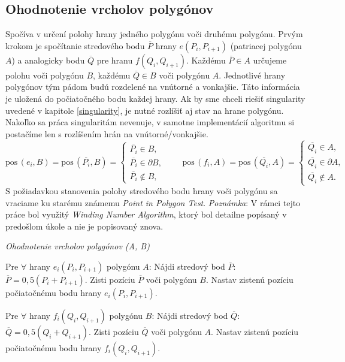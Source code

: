 \documentclass[11pt]{article}
\begin{document}
\subsection{Ohodnotenie vrcholov polygónov} \label{position}
Spočíva v určení polohy hrany jedného polygónu voči druhému polygónu. Prvým krokom je spočítanie stredového bodu $\overline{P}$ hrany $e(P_i, P_{i+1})$ (patriacej polygónu $A$) a analogicky bodu $\overline{Q}$ pre \linebreak hranu $f(Q_i, Q_{i+1})$. Každému $\overline{P} \in A$ určujeme polohu voči polygónu $B$, každému $\overline{Q} \in B$ voči polygónu $A$. Jednotlivé hrany polygónov tým pádom budú rozdelené na vnútorné a vonkajšie. Táto informácia je uložená do počiatočného bodu každej hrany. Ak by sme chceli riešiť singularity uvedené v kapitole \ref{singularity}, je nutné rozlíšiť aj stav na hrane polygónu. Nakoľko sa práca singularitám nevenuje, v samotne implementácií algoritmu si postačíme len s rozlíšením hrán na vnútorné/vonkajšie.
\begin{equation*}
\text{pos}\,(e_i, B)=\text{pos}\,(\overline{P_i}, B) =
\begin{cases}
    \overline{P_i} \in B,\\
    \overline{P_i} \in \partial B,\\
    \overline{P_i} \notin B,
\end{cases} \quad \quad
\text{pos}\,(f_i, A)=\text{pos}\,(\overline{Q_i}, A) =
\begin{cases}
    \overline{Q_i} \in A,\\
    \overline{Q_i} \in \partial A,\\
    \overline{Q_i} \notin A.
\end{cases}
\end{equation*}
S požiadavkou stanovenia polohy stredového bodu hrany voči polygónu sa vraciame ku starému známemu \textit{Point in Polygon Test}. \newline
\textit{Poznámka}: V rámci tejto práce bol využitý \textit{Winding Number Algorithm}, ktorý bol detailne popísaný v predošlom úkole a nie je popisovaný znova.
\begin{algorithm}
    \caption {\textit{Ohodnotenie vrcholov polygónov (A, B)}}
    \begin{algorithmic}[1]
        \State Pre $\forall$ hrany $e_i(P_i, P_{i+1})$ polygónu $A$:
        \State \indent Nájdi stredový bod $\overline{P}$: $\overline{P} = 0,5(P_i + P_{i+1})$.
        \State \indent Zisti pozíciu $\overline{P}$ voči polygónu $B$.
        \State \indent Nastav zistenú pozíciu počiatočnému bodu hrany $e_i(P_i, P_{i+1})$.
        
        \State Pre $\forall$ hrany $f_i(Q_i, Q_{i+1})$ polygónu $B$:
        \State \indent Nájdi stredový bod $\overline{Q}$: $\overline{Q} = 0,5(Q_i + Q_{i+1})$.
        \State \indent Zisti pozíciu $\overline{Q}$ voči polygónu $A$.
        \State \indent Nastav zistenú pozíciu počiatočnému bodu hrany $f_i(Q_i, Q_{i+1})$.
    \end{algorithmic}
\end{algorithm}
\end{document}
